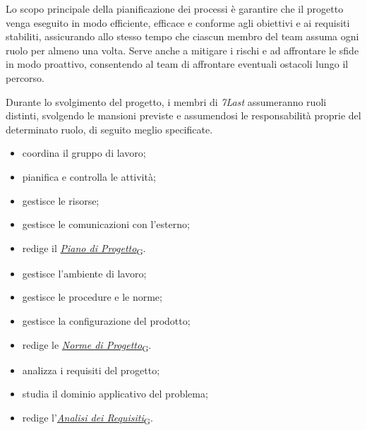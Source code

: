 Lo scopo principale della pianificazione dei processi è garantire che il progetto venga eseguito in modo efficiente, efficace e conforme agli obiettivi e ai requisiti stabiliti, assicurando allo stesso tempo che ciascun membro del team assuma ogni ruolo per almeno una volta. Serve anche a mitigare i rischi e ad affrontare le sfide in modo proattivo, consentendo al team di affrontare eventuali ostacoli lungo il percorso.

Durante lo svolgimento del progetto, i membri di \textit{7Last} assumeranno ruoli distinti, svolgendo le mansioni previste e assumendosi le responsabilità proprie del determinato ruolo, di seguito meglio specificate.

\begin{itemize}
    \item coordina il gruppo di lavoro;
    \item pianifica e controlla le attività;
    \item gestisce le risorse;
    \item gestisce le comunicazioni con l'esterno;
    \item redige il \href{https://7last.github.io/docs/pb/documentazione-interna/glossario\#piano-di-progetto}{\textit{Piano di Progetto}\textsubscript{G}}.
\end{itemize}

\begin{itemize}
    \item gestisce l'ambiente di lavoro;
    \item gestisce le procedure e le norme;
    \item gestisce la configurazione del prodotto;
    \item redige le \href{https://7last.github.io/docs/pb/documentazione-interna/glossario\#norme-di-progetto}{\textit{Norme di Progetto}\textsubscript{G}}.
\end{itemize}

\begin{itemize}
    \item analizza i requisiti del progetto;
    \item studia il dominio applicativo del problema;
    \item redige l'\href{https://7last.github.io/docs/pb/documentazione-interna/glossario\#analisi-dei-requisiti}{\textit{Analisi dei Requisiti}\textsubscript{G}}.
\end{itemize}

